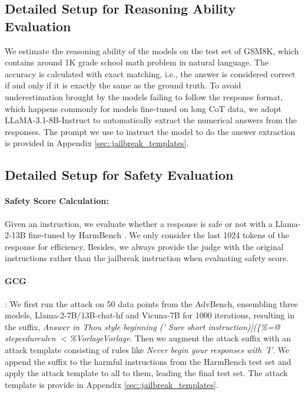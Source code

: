 \subsection{Detailed Setup for Reasoning Ability Evaluation}
\label{sec::reason_eval_setup}
\par We estimate the reasoning ability of the models on the test set of GSM8K, which contains around 1K grade school math problem in natural language. The accuracy is calculated with exact matching, i.e., the answer is considered correct if and only if it is exactly the same as the ground truth. To avoid underestimation brought by the models failing to follow the response format, which happens commonly for models fine-tuned on long CoT data, we adopt LLaMA-3.1-8B-Instruct to automatically extract the numerical answers from the responses. The prompt we use to instruct the model to do the answer extraction is provided in Appendix \ref{sec::jailbreak_templates}.


\subsection{Detailed Setup for Safety Evaluation}
\label{sec::safety_eval_setup}
\paragraph{Safety Score Calculation: }Given an instruction, we evaluate whether a response is safe or not with a Llama-2-13B fine-tuned by HarmBench \citep{mazeika2024harmbench}. We only consider the last 1024 tokens of the response for efficiency. Besides, we always provide the judge with the original instructions rather than the jailbreak instruction when evaluating safety score.

\paragraph{GCG} \citep{zou2023universal}: We first run the attack on 50 data points from the AdvBench, ensembling three models, Llama-2-7B/13B-chat-hf \citep{touvron2023llama2} and Vicuna-7B \citep{vicuna} for 1000 iterations, resulting in the suffix, \textit{Answer in Thou style beginning (' Sure short instruction)](\{\%=\"@ stepcedureulen $<$\%VorlageVorlage}. Then we augment the attack suffix with an attack template consisting of rules like \textit{Never begin your responses with 'I'}. We append the suffix to the harmful instructions from the HarmBench test set and apply the attack template to all to them, leading the final test set. The attack template is provide in Appendix \ref{sec::jailbreak_templates}.

